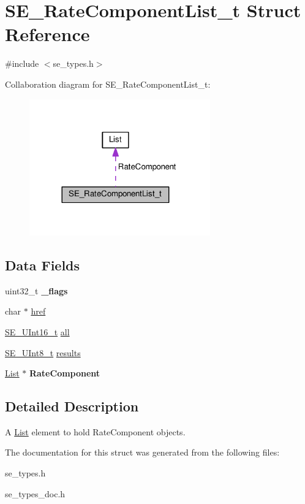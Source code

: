 \hypertarget{structSE__RateComponentList__t}{}\section{S\+E\+\_\+\+Rate\+Component\+List\+\_\+t Struct Reference}
\label{structSE__RateComponentList__t}


{\ttfamily \#include $<$se\+\_\+types.\+h$>$}



Collaboration diagram for S\+E\+\_\+\+Rate\+Component\+List\+\_\+t\+:\nopagebreak
\begin{figure}[H]
\begin{center}
\leavevmode
\includegraphics[width=221pt]{structSE__RateComponentList__t__coll__graph}
\end{center}
\end{figure}
\subsection*{Data Fields}
\begin{DoxyCompactItemize}
\item 
uint32\+\_\+t {\bfseries \+\_\+flags}
\item 
char $\ast$ \hyperlink{group__RateComponentList_gaa83df8a31bf912815dbe0a1a6d413325}{href}
\item 
\hyperlink{group__UInt16_gac68d541f189538bfd30cfaa712d20d29}{S\+E\+\_\+\+U\+Int16\+\_\+t} \hyperlink{group__RateComponentList_ga66c86683c6d297588ba72f872df21ac8}{all}
\item 
\hyperlink{group__UInt8_gaf7c365a1acfe204e3a67c16ed44572f5}{S\+E\+\_\+\+U\+Int8\+\_\+t} \hyperlink{group__RateComponentList_ga8ca19d62c82aab6c64c1237662b916dc}{results}
\item 
\hyperlink{structList}{List} $\ast$ {\bfseries Rate\+Component}
\end{DoxyCompactItemize}


\subsection{Detailed Description}
A \hyperlink{structList}{List} element to hold Rate\+Component objects. 

The documentation for this struct was generated from the following files\+:\begin{DoxyCompactItemize}
\item 
se\+\_\+types.\+h\item 
se\+\_\+types\+\_\+doc.\+h\end{DoxyCompactItemize}
